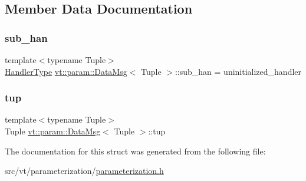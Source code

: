 \subsection{Member Data Documentation}
\mbox{\label{structvt_1_1param_1_1_data_msg_a5356937e3d47eff93d8b0c59247c5809}} 
\subsubsection{\texorpdfstring{sub\+\_\+han}{sub\_han}}
{\footnotesize\ttfamily template$<$typename Tuple$>$ \\
\hyperlink{namespacevt_af64846b57dfcaf104da3ef6967917573}{Handler\+Type} \hyperlink{structvt_1_1param_1_1_data_msg}{vt\+::param\+::\+Data\+Msg}$<$ Tuple $>$\+::sub\+\_\+han = uninitialized\+\_\+handler}

\mbox{\label{structvt_1_1param_1_1_data_msg_aa607f9d80d37b1c72f284ea3048e5788}} 
\subsubsection{\texorpdfstring{tup}{tup}}
{\footnotesize\ttfamily template$<$typename Tuple$>$ \\
Tuple \hyperlink{structvt_1_1param_1_1_data_msg}{vt\+::param\+::\+Data\+Msg}$<$ Tuple $>$\+::tup}



The documentation for this struct was generated from the following file\+:\begin{DoxyCompactItemize}
\item 
src/vt/parameterization/\hyperlink{parameterization_8h}{parameterization.\+h}\end{DoxyCompactItemize}
